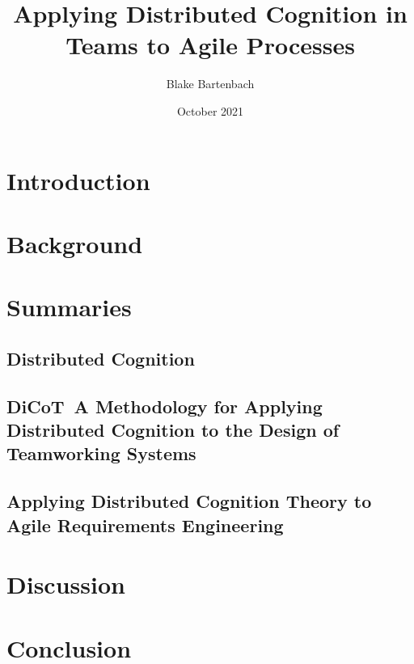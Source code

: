 \documentclass[acmsmall,screen]{acmart}
\begin{document}
\title{Applying Distributed Cognition in Teams to Agile Processes}

\author{Blake Bartenbach}
\date{October 2021}

\acmBooktitle{}

\begin{abstract}
  
\end{abstract}

\maketitle

\section{Introduction}


\section{Background}


\section{Summaries}
\subsection{Distributed Cognition}


\subsection{DiCoT\colon~A Methodology for Applying Distributed Cognition to the Design of Teamworking Systems}


\subsection{Applying Distributed Cognition Theory to Agile Requirements Engineering}


\section{Discussion}


\section{Conclusion}




\end{document}
